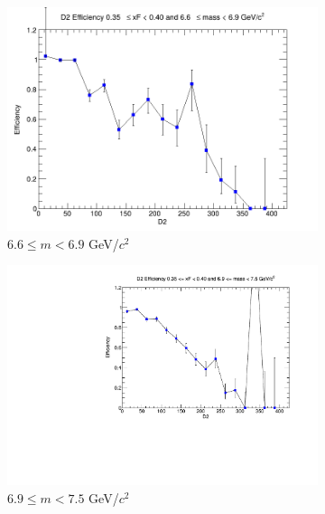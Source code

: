 \documentclass[11pt]{article}
\begin{document}
\begin{figure}[p]
\begin{subfigure}[b]{0.32\textwidth}
        \includegraphics[width=\textwidth]{./kTrackerEfficiencyPlots/D2_Efficiency_xF7_mass8.png}
        \caption{$6.6 \leq m < 6.9$ GeV/$c^2$}
    \end{subfigure}\vspace{0.5cm}
    \begin{subfigure}[b]{0.32\textwidth}
        \centering
        \includegraphics[width=\textwidth]{./kTrackerEfficiencyPlots/D2_Efficiency_xF7_mass9.pdf}
        \caption{$6.9 \leq m < 7.5$ GeV/$c^2$}
    \end{subfigure}\hfill
    \begin{subfigure}[b]{0.32\textwidth}
        \centering

\end{subfigure}
\end{figure}
\end{document}
